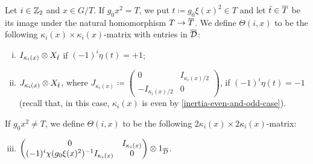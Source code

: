 \begin{defi}\label{defi:blocks-of-Theta}
    Let $i\in \mathbb{Z}_2$ and $x \in G/T$. 
    If $g_0x^2 = T$, we put $t \coloneqq g_0 \xi(x)^2 \in T$ and let $\bar t \in \barr T$ be its image under the natural homomorphism $T \to \barr T$. 
    We define $\Theta(i, x)$ to be the following $\kappa_i(x) \times \kappa_i(x)$-matrix with entries in $\barr \D$:
    \begin{enumerate}[(i)]
        \item $I_{\kappa_i(x)} \otimes X_{\bar t}$ if $(-1)^i \eta(t) = +1$;
		\item  $J_{\kappa_i(x)} \otimes X_{\bar t}$, where $J_{\kappa_i(x)} \coloneqq \begin{pmatrix}
				      0                & I_{\kappa_i(x)/2} \\
				      -I_{\kappa_i(x)/2} & 0
			      \end{pmatrix}$, if  $(-1)^i \eta(t) = -1$ (recall that, in this case, $\kappa_i(x)$ is even by \cref{inertia-even-and-odd-case}). 
	\end{enumerate}
    If $g_0 x^2 \neq T$, we define $\Theta(i, x)$ to be the following $2\kappa_i(x) \times 2\kappa_i(x)$-matrix:
    \begin{enumerate}[(i)]
        \setcounter{enumi}{2}
		\item $\begin{pmatrix}
			0  &  I_{\kappa_i(x)} \\
			(-1)^{i} \chi(g_0 \xi(x)^2)\inv I_{\kappa_i(x)} & 0
		\end{pmatrix} \tensor 1_{\barr \D}$. 
    \end{enumerate}
\end{defi}

